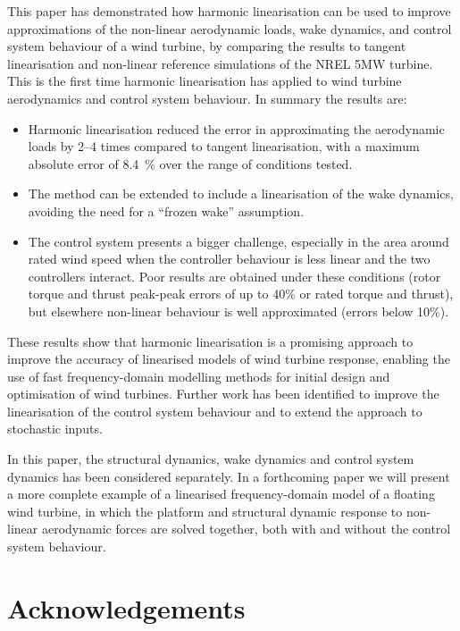 \documentclass[preprint]{elsarticle}
\begin{document}
This paper has demonstrated how harmonic linearisation can be used to improve
approximations of the non-linear aerodynamic loads, wake dynamics, and control
system behaviour of a wind turbine, by comparing the results to tangent
linearisation and non-linear reference simulations of the NREL 5MW turbine. This
is the first time harmonic linearisation has applied to wind turbine
aerodynamics and control system behaviour. In summary the results are:
\begin{itemize}
\item Harmonic linearisation reduced the error in approximating the aerodynamic
  loads by 2--4 times compared to tangent linearisation, with a maximum absolute
  error of \SI{8.4}{\percent} over the range of conditions tested.
\item The method can be extended to include a linearisation of the wake
  dynamics, avoiding the need for a ``frozen wake'' assumption.
\item The control system presents a bigger challenge, especially in the area
  around rated wind speed when the controller behaviour is less linear and the
  two controllers interact. Poor results are obtained under these conditions
  (rotor torque and thrust peak-peak errors of up to 40\% or rated torque and
  thrust), but elsewhere non-linear behaviour is well approximated (errors below
  10\%). 
\end{itemize}

These results show that harmonic linearisation is a promising approach to
improve the accuracy of linearised models of wind turbine response, enabling the
use of fast frequency-domain modelling methods for initial design and
optimisation of wind turbines. Further work has been identified to improve the
linearisation of the control system behaviour and to extend the approach to
stochastic inputs.

In this paper, the structural dynamics, wake dynamics and control system
dynamics has been considered separately. In a forthcoming paper we will present
a more complete example of a linearised frequency-domain model of a floating
wind turbine, in which the platform and structural dynamic response to
non-linear aerodynamic forces are solved together, both with and without the
control system behaviour.


\section*{Acknowledgements}
\end{document}

